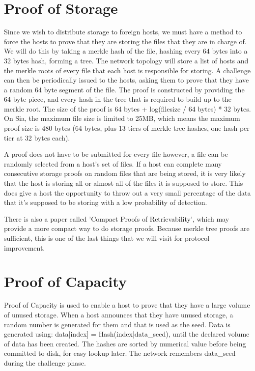 \documentclass[twocolumn]{article}
\begin{document}
\begin{appendices}
\section{Proof of Storage}
Since we wish to distribute storage to foreign hosts, we must have a method to force the hosts to prove that they are storing the files that they are in charge of.
We will do this by taking a merkle hash of the file, hashing every 64 bytes into a 32 bytes hash, forming a tree.
The network topology will store a list of hosts and the merkle roots of every file that each host is responsible for storing.
A challenge can then be periodically issued to the hosts, asking them to prove that they have a random 64 byte segment of the file.
The proof is constructed by providing the 64 byte piece, and every hash in the tree that is required to build up to the merkle root.
The size of the proof is 64 bytes + log(filesize / 64 bytes) * 32 bytes.
On Sia, the maximum file size is limited to 25MB, which means the maximum proof size is 480 bytes (64 bytes, plus 13 tiers of merkle tree hashes, one hash per tier at 32 bytes each).

A proof does not have to be submitted for every file however, a file can be randomly selected from a host's set of files.
If a host can complete many consecutive storage proofs on random files that are being stored, it is very likely that the host is storing all or almost all of the files it is supposed to store.
This does give a host the opportunity to throw out a very small percentage of the data that it's supposed to be storing with a low probability of detection.

There is also a paper called 'Compact Proofs of Retrievability', which may provide a more compact way to do storage proofs.
Because merkle tree proofs are sufficient, this is one of the last things that we will visit for protocol improvement.

\section{Proof of Capacity}
Proof of Capacity is used to enable a host to prove that they have a large volume of unused storage.
When a host announces that they have unused storage, a random number is generated for them and that is used as the seed.
Data is generated using: data[index] = Hash(index|data\_seed), until the declared volume of data has been created.
The hashes are sorted by numerical value before being committed to disk, for easy lookup later.
The network remembers data\_seed during the challenge phase.


\end{appendices}
\end{document}
